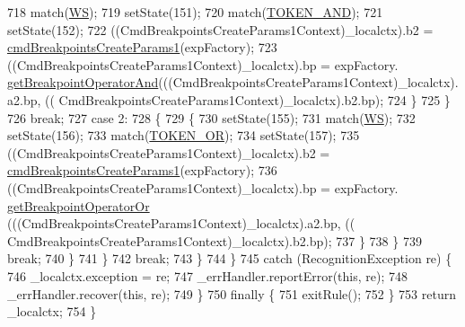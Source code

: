 \begin{DoxyCode}
718           match(\hyperlink{classgov_1_1nasa_1_1jpf_1_1inspector_1_1server_1_1expression_1_1parser_1_1_expression_grammar_parser_ace44714ae633c7b14794cc5a24d9ebf3}{WS});
719           setState(151);
720           match(\hyperlink{classgov_1_1nasa_1_1jpf_1_1inspector_1_1server_1_1expression_1_1parser_1_1_expression_grammar_parser_a331667ae98e64b4bcdd3b866e7e2cd64}{TOKEN\_AND});
721           setState(152);
722           ((CmdBreakpointsCreateParams1Context)\_localctx).b2 = 
      \hyperlink{classgov_1_1nasa_1_1jpf_1_1inspector_1_1server_1_1expression_1_1parser_1_1_expression_grammar_parser_aa16584e37b631f4c0cdd1b148deda9df}{cmdBreakpointsCreateParams1}(expFactory);
723            ((CmdBreakpointsCreateParams1Context)\_localctx).bp =  expFactory.
      \hyperlink{classgov_1_1nasa_1_1jpf_1_1inspector_1_1server_1_1expression_1_1_expression_factory_ad31f78a1f8d431686f1efdea0ede572b}{getBreakpointOperatorAnd}(((CmdBreakpointsCreateParams1Context)\_localctx).a2.bp, ((
      CmdBreakpointsCreateParams1Context)\_localctx).b2.bp); 
724           \}
725           \}
726           \textcolor{keywordflow}{break};
727         \textcolor{keywordflow}{case} 2:
728           \{
729           \{
730           setState(155);
731           match(\hyperlink{classgov_1_1nasa_1_1jpf_1_1inspector_1_1server_1_1expression_1_1parser_1_1_expression_grammar_parser_ace44714ae633c7b14794cc5a24d9ebf3}{WS});
732           setState(156);
733           match(\hyperlink{classgov_1_1nasa_1_1jpf_1_1inspector_1_1server_1_1expression_1_1parser_1_1_expression_grammar_parser_a58d1da7a1e088d5c9ec31125f10322dd}{TOKEN\_OR});
734           setState(157);
735           ((CmdBreakpointsCreateParams1Context)\_localctx).b2 = 
      \hyperlink{classgov_1_1nasa_1_1jpf_1_1inspector_1_1server_1_1expression_1_1parser_1_1_expression_grammar_parser_aa16584e37b631f4c0cdd1b148deda9df}{cmdBreakpointsCreateParams1}(expFactory);
736            ((CmdBreakpointsCreateParams1Context)\_localctx).bp =  expFactory.
      \hyperlink{classgov_1_1nasa_1_1jpf_1_1inspector_1_1server_1_1expression_1_1_expression_factory_a3fe75976271f06e318517aaa94809470}{getBreakpointOperatorOr} (((CmdBreakpointsCreateParams1Context)\_localctx).a2.bp, ((
      CmdBreakpointsCreateParams1Context)\_localctx).b2.bp); 
737           \}
738           \}
739           \textcolor{keywordflow}{break};
740         \}
741         \}
742         \textcolor{keywordflow}{break};
743       \}
744     \}
745     \textcolor{keywordflow}{catch} (RecognitionException re) \{
746       \_localctx.exception = re;
747       \_errHandler.reportError(\textcolor{keyword}{this}, re);
748       \_errHandler.recover(\textcolor{keyword}{this}, re);
749     \}
750     \textcolor{keywordflow}{finally} \{
751       exitRule();
752     \}
753     \textcolor{keywordflow}{return} \_localctx;
754   \}
\end{DoxyCode}
